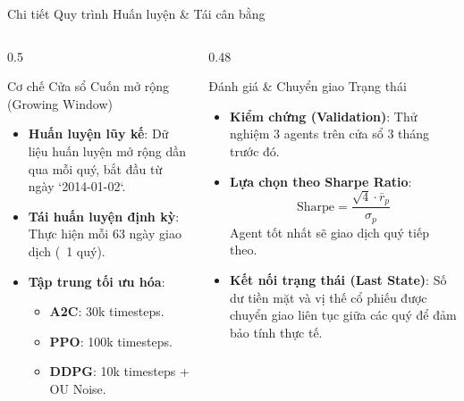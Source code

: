 \documentclass[10pt,aspectratio=169]{beamer}
\begin{document}
\begin{frame}{Chi tiết Quy trình Huấn luyện \& Tái cân bằng}
  \begin{columns}[t]
    \begin{column}{0.5\textwidth}
      \begin{block}{Cơ chế Cửa sổ Cuốn mở rộng (Growing Window)}
        \begin{itemize}
          \item \textbf{Huấn luyện lũy kế}: Dữ liệu huấn luyện mở rộng dần qua mỗi quý, bắt đầu từ ngày `2014-01-02`.
          \item \textbf{Tái huấn luyện định kỳ}: Thực hiện mỗi 63 ngày giao dịch (~1 quý).
          \item \textbf{Tập trung tối ưu hóa}:
            \begin{itemize}
              \item \textbf{A2C}: 30k timesteps.
              \item \textbf{PPO}: 100k timesteps.
              \item \textbf{DDPG}: 10k timesteps + OU Noise.
            \end{itemize}
        \end{itemize}
      \end{block}
    \end{column}
    
    \begin{column}{0.48\textwidth}
      \begin{exampleblock}{Đánh giá \& Chuyển giao Trạng thái}
        \begin{itemize}
          \item \textbf{Kiểm chứng (Validation)}: Thử nghiệm 3 agents trên cửa sổ 3 tháng trước đó.
          \item \textbf{Lựa chọn theo Sharpe Ratio}:
            $$\text{Sharpe} = \frac{\sqrt{4} \cdot \bar{r}_p}{\sigma_p}$$
            Agent tốt nhất sẽ giao dịch quý tiếp theo.
          \item \textbf{Kết nối trạng thái (Last State)}:
            Số dư tiền mặt và vị thế cổ phiếu được chuyển giao liên tục giữa các quý để đảm bảo tính thực tế.
        \end{itemize}
      \end{exampleblock}
    \end{column}
  \end{columns}
\end{frame}
\end{document}
